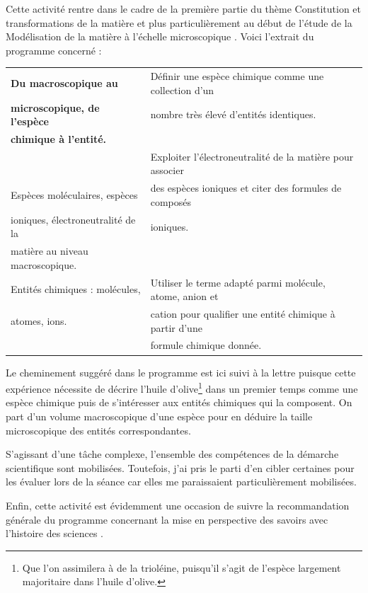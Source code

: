 \documentclass[12pt,a4paper]{article}
\begin{document}
Cette activité rentre dans le cadre de la première partie du thème \og Constitution et transformations de la matière \fg{} et plus particulièrement au début de l'étude de la \og Modélisation de la matière à l'échelle microscopique \fg{}.
Voici l'extrait du programme concerné :
\begin{center}
\begin{tabular}{|l|l|}
\hline
\textbf{Du macroscopique au} 			& Définir une espèce chimique comme une collection d'un \\
\textbf{microscopique, de l'espèce}	& nombre très élevé d'entités identiques. \\
\textbf{chimique à l'entité.}					& \\
																& Exploiter l'électroneutralité de la matière pour associer\\
Espèces moléculaires, espèces		& des espèces ioniques et citer des formules de composés\\
ioniques, électroneutralité de la			& ioniques.\\
matière au niveau	 macroscopique.	& \\
\hline
Entités chimiques : molécules,			& Utiliser le terme adapté parmi molécule, atome, anion et \\
atomes, ions.											& cation pour qualifier une entité chimique à partir d'une \\
																& formule chimique donnée. \\
\hline
\end{tabular}
\end{center}
Le cheminement suggéré dans le programme est ici suivi à la lettre puisque cette expérience nécessite de décrire l'huile d'olive\footnote{Que l'on assimilera à de la trioléine, puisqu'il s'agit de l'espèce largement majoritaire dans l'huile d'olive.} dans un premier temps comme une espèce chimique puis de s'intéresser aux entités chimiques qui la composent.
On part d'un volume macroscopique d'une espèce pour en déduire la taille microscopique des entités correspondantes.

S'agissant d'une tâche complexe, l'ensemble des compétences de la démarche scientifique sont mobilisées.
Toutefois, j'ai pris le parti d'en cibler certaines pour les évaluer lors de la séance car elles me paraissaient particulièrement mobilisées.

Enfin, cette activité est évidemment une occasion de suivre la recommandation générale du programme concernant la \og mise en perspective des savoirs avec l'histoire des sciences \fg{}.
\end{document}
